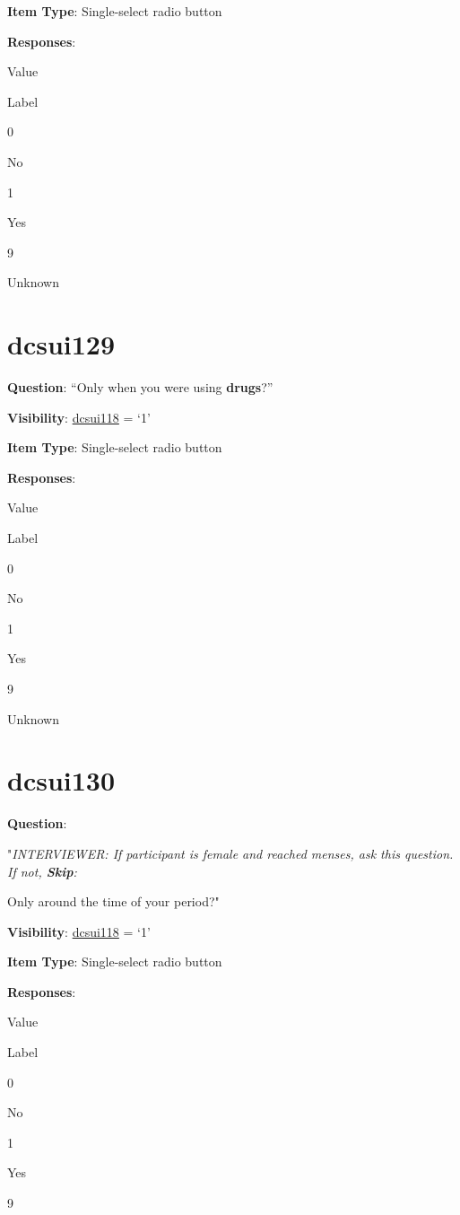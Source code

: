 \documentclass[]{book}
\begin{document}
\textbf{Item Type}: Single-select radio button

\textbf{Responses}:

Value

Label

0

No

1

Yes

9

Unknown

\hypertarget{dcsui129}{%
\section{dcsui129}\label{dcsui129}}

\textbf{Question}: ``Only when you were using \textbf{drugs}?''

\textbf{Visibility}: \protect\hyperlink{dcsui118}{dcsui118} = `1'

\textbf{Item Type}: Single-select radio button

\textbf{Responses}:

Value

Label

0

No

1

Yes

9

Unknown

\hypertarget{dcsui130}{%
\section{dcsui130}\label{dcsui130}}

\textbf{Question}:

"\emph{INTERVIEWER: If participant is female and reached menses, ask this question. If not, \textbf{Skip}:}

Only around the time of your period?"

\textbf{Visibility}: \protect\hyperlink{dcsui118}{dcsui118} = `1'

\textbf{Item Type}: Single-select radio button

\textbf{Responses}:

Value

Label

0

No

1

Yes

9
\end{document}
